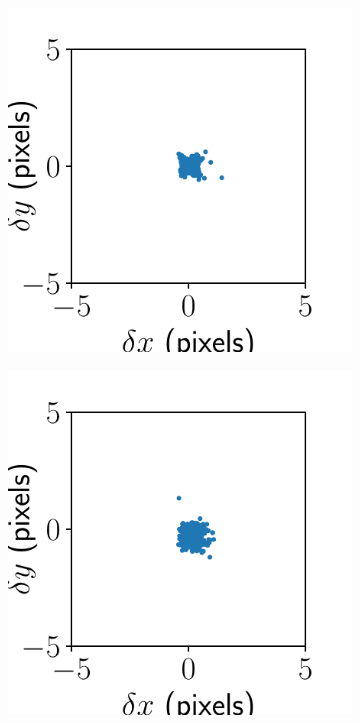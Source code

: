 \documentclass{article}
\begin{document}
\begin{figure}[ht]
\begin{subfigure}{0.24\linewidth}
		\caption{}
		\label{fig:alignmentresultBMS1}
	\end{subfigure}
	\begin{subfigure}{0.24\linewidth}
		\includegraphics[width=\linewidth]{stitch-result-BMS-4.pdf}
		\caption{}
		\label{fig:stitchresultBMS4}
	\end{subfigure}
	\begin{subfigure}{0.24\linewidth}
		\includegraphics[width=\linewidth]{stitch-result-BMS-3.pdf}

\end{subfigure}
\end{figure}
\end{document}
